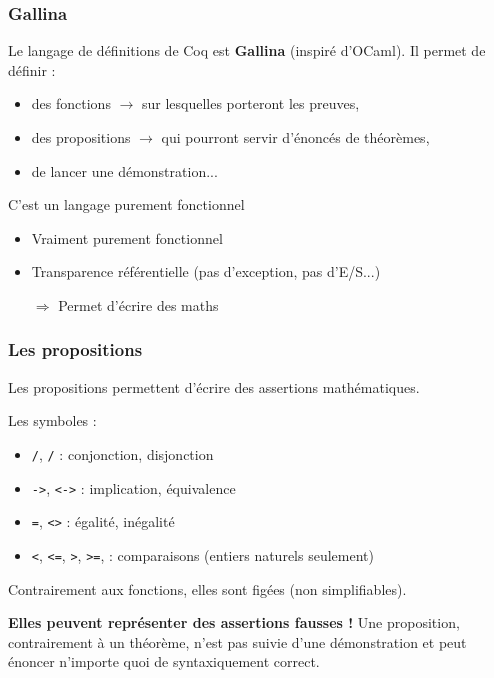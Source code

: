 \documentclass[9pt]{beamer}
\newenvironment{warn}[1][Attention]{\begin{alertblock}{#1}}{\end{alertblock}}
\begin{document}
\begin{frame}
\frametitle{Gallina}

Le langage de définitions de Coq est \textbf{Gallina} (inspiré d'OCaml). Il permet de définir :
\begin{itemize}
  \item des fonctions $\rightarrow$ sur lesquelles porteront les preuves,
  \item des propositions $\rightarrow$ qui pourront servir d'énoncés de théorèmes,
  \item de lancer une démonstration...
\end{itemize}

\pause
\medskip
C'est un langage purement fonctionnel
\begin{itemize}
  \item Vraiment purement fonctionnel
  \item Transparence référentielle (pas d'exception, pas d'E/S...)
  \item[$\Rightarrow$] Permet d'écrire des maths
\end{itemize}

\end{frame}



\newcommand{\bs}{\symbol{92}}
\begin{frame}
\frametitle{Les propositions}

Les propositions permettent d'écrire des assertions mathématiques.

\medskip
Les symboles :
\begin{itemize}
  \item \texttt{/\bs}, \texttt{\bs/} : conjonction, disjonction
  \item \texttt{->}, \texttt{<->} : implication, équivalence
  \item \texttt{=}, \texttt{<>} : égalité, inégalité
  \item \texttt{<}, \texttt{<=}, \texttt{>}, \texttt{>=}, : comparaisons (entiers naturels seulement)
\end{itemize}

\medskip
Contrairement aux fonctions, elles sont figées (non simplifiables).

\pause
\begin{warn}[]
\textbf{Elles peuvent représenter des assertions fausses !} Une proposition, contrairement à un théorème, n'est pas suivie d'une démonstration et peut énoncer n'importe quoi de syntaxiquement correct.
\end{warn}

\end{frame}
\end{document}
